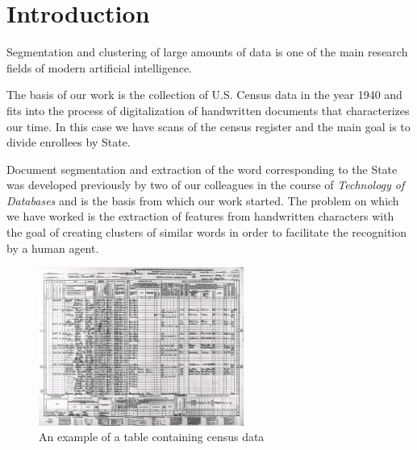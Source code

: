 \section{Introduction}
Segmentation and clustering of large amounts of data is one of the main research fields of modern artificial intelligence.

The basis of our work is the collection of U.S. Census data in the year 1940 and fits into the process of digitalization of handwritten documents that characterizes our time. In this case we have scans of the census register and the main goal is to divide enrollees by State.

Document segmentation and extraction of the word corresponding to the State was developed previously by two of our colleagues in the course of \emph{Technology of Databases} and is the basis from which our work started.
The problem on which we have worked is the extraction of features from handwritten characters with the goal of creating clusters of similar words in order to facilitate the recognition by a human agent.

\begin{figure}[!ht]
\centering
\includegraphics[width=0.6\textwidth]{images/img1.jpg}
\caption{An example of a table containing census data}
\end{figure}